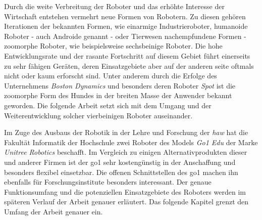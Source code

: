 Durch die weite Verbreitung der Roboter und das erhöhte Interesse der Wirtschaft entstehen vermehrt neue Formen von Robotern.
Zu diesen gehören Iterationen der bekannten Formen, wie einarmige Industrieroboter, humanoide Roboter - auch Androide genannt - oder
Tierwesen nachempfundene Formen - zoomorphe Roboter, wie beispielsweise sechsbeinige Roboter.
Die hohe Entwicklungsrate und der rasante Fortschritt auf diesem Gebiet führt einerseits zu sehr fähigen Geräten,
deren Einsatzgebiete aber auf der anderen seite oftmals nicht oder kaum erforscht sind.
Unter anderem durch die Erfolge des Unternehmens \emph{Boston Dynamics} und besonders deren Roboter \emph{Spot} ist die zoomorphe Form
des Hundes in der breiten Masse der Anwender bekannt geworden.
Die folgende Arbeit setzt sich mit dem Umgang und der Weiterentwicklung solcher vierbeinigen Roboter auseinander.


Im Zuge des Ausbaus der Robotik in der Lehre und Forschung der \emph{\gls{haw}} hat
die Fakultät Informatik der Hochschule zwei Roboter des Models \emph{Go1 Edu} der Marke \emph{Unitree Robotics} beschafft.
Im Vergleich zu einigen Alternativprodukten dieser und anderer Firmen ist der \gls{go1} sehr kostengünstig in der Anschaffung und besonders flexibel einsetzbar.
Die offenen Schnittstellen des \gls{go1} machen ihn ebenfalls für Forschungsinstitute besonders interessant.
Der genaue Funktionsumfang und die potenziellen Einsatzgebiete des Roboters werden im späteren Verlauf der Arbeit genauer erläutert.
Das folgende Kapitel grenzt den Umfang der Arbeit genauer ein.

\label{subsec:zielsetzung-und-methodik}


